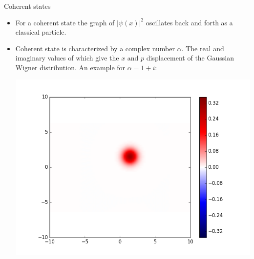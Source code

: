 \documentclass{beamer}
\begin{document}
\begin{frame}{Coherent states}
	\begin{itemize}
		\vfill
		\item For a coherent state the graph of $|\psi(x)|^2$ oscillates back and forth as a classical particle.
		\vfill
		\item Coherent state is characterized by a complex number $\alpha$. The real and imaginary values of which give the $x$ and $p$ displacement of the Gaussian Wigner distribution. An example for $\alpha = 1+i$:
		\begin{minipage}[t][][b]{\linewidth}
			\centering
			\vspace*{-10pt}
			\includegraphics[width=0.6\linewidth]{oscCoh11}
		\end{minipage}
		\vfill
	\end{itemize}
\end{frame}
\end{document}
